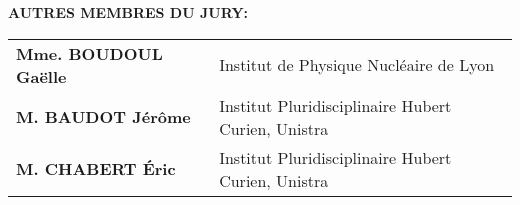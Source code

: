 \begin{titlepage}
        \vspace*{0.5cm}
        {\large \textbf{AUTRES MEMBRES DU JURY:}}\\
        \begin{tabular}{ll}
            \hspace{1cm}    \textbf{Mme. BOUDOUL Gaëlle~~}            & Institut de Physique Nucléaire de Lyon \\
            \hspace{1cm}    \textbf{M. BAUDOT Jérôme}               & Institut Pluridisciplinaire Hubert Curien, Unistra \\
            \hspace{1cm}    \textbf{M. CHABERT Éric}                & Institut Pluridisciplinaire Hubert Curien, Unistra \\
        \end{tabular}

        \vspace*{0.5cm}

    \vspace*{1cm}
\end{titlepage}
\restoregeometry
